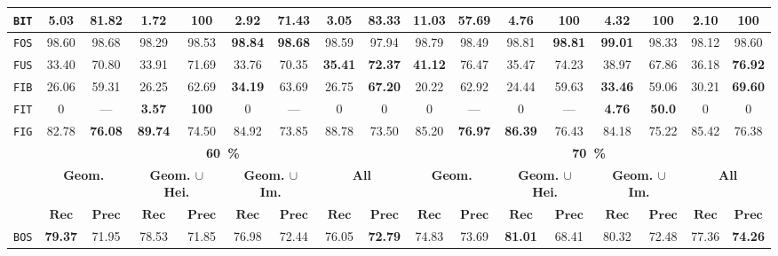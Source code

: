 \begin{sidewaystable}
\begin{center}
\begin{tabular}{|c | c c | c c | c c | c c || c c | c c | c c | c c |}
                    \hline
                    \texttt{BIT} & \textbf{5.03} & 81.82 & 1.72 & \textbf{100} & 2.92 & 71.43 & 3.05 & 83.33 & \textbf{11.03} & 57.69 & 4.76 & \textbf{100} & 4.32 & \textbf{100} & 2.10 & \textbf{100} \\
                    \hline
                    \texttt{FOS} & 98.60 & 98.68 & 98.29 & 98.53 & \textbf{98.84} & \textbf{98.68} & 98.59 & 97.94 & 98.79 & 98.49 & 98.81 & \textbf{98.81} & \textbf{99.01} & 98.33 & 98.12 & 98.60 \\
                    \hline
                    \texttt{FUS} & 33.40 & 70.80 & 33.91 & 71.69 & 33.76 & 70.35 & \textbf{35.41} & \textbf{72.37} & \textbf{41.12} & 76.47 & 35.47 & 74.23 & 38.97 & 67.86 & 36.18 & \textbf{76.92} \\
                    \hline
                    \texttt{FIB} & 26.06 & 59.31 & 26.25 & 62.69 & \textbf{34.19} & 63.69 & 26.75 & \textbf{67.20} & 20.22 & 62.92 & 24.44 & 59.63 & \textbf{33.46} & 59.06 & 30.21 & \textbf{69.60} \\
                    \hline
                    \texttt{FIT} & 0 & --- & \textbf{3.57} & \textbf{100} & 0 & --- & 0 & 0 & 0 & --- & 0 & --- & \textbf{4.76} & \textbf{50.0} & 0 & 0 \\
                    \hline
                    \texttt{FIG} & 82.78 & \textbf{76.08} & \textbf{89.74} & 74.50 & 84.92 & 73.85 & 88.78 & 73.50 & 85.20 & \textbf{76.97} & \textbf{86.39} & 76.43 & 84.18 & 75.22 & 85.42 & 76.38 \\
                    \hline
                    \hline
                    & \multicolumn{8}{c||}{\textbf{\SI{60}{\percent}}} & \multicolumn{8}{c|}{\textbf{\SI{70}{\percent}}}\\
                    \hline
                    &\multicolumn{2}{c|}{\textbf{Geom.}} & \multicolumn{2}{c|}{\textbf{Geom. $\cup$ Hei.}} & \multicolumn{2}{c|}{\textbf{Geom. $\cup$ Im.}} & \multicolumn{2}{c||}{\textbf{All}} & \multicolumn{2}{c|}{\textbf{Geom.}} & \multicolumn{2}{c|}{\textbf{Geom. $\cup$ Hei.}} & \multicolumn{2}{c|}{\textbf{Geom. $\cup$ Im.}} & \multicolumn{2}{x{1.5cm}|}{\textbf{All}}\\
                    \cline{2-17}
                    & $\bm{Rec}$ & $\bm{Prec}$ &  $\bm{Rec}$ & $\bm{Prec}$ &  $\bm{Rec}$ & $\bm{Prec}$ &  $\bm{Rec}$ & $\bm{Prec}$ & $\bm{Rec}$ & $\bm{Prec}$ &  $\bm{Rec}$ & $\bm{Prec}$ &  $\bm{Rec}$ & $\bm{Prec}$ &  $\bm{Rec}$ & $\bm{Prec}$ \\
                    \hline
                    \texttt{BOS} & \textbf{79.37} & 71.95 & 78.53 & 71.85 & 76.98 & 72.44 & 76.05 & \textbf{72.79} & 74.83 & 73.69 & \textbf{81.01} & 68.41 & 80.32 & 72.48 & 77.36 & \textbf{74.26} \\

\end{tabular}
\end{center}
\end{sidewaystable}
